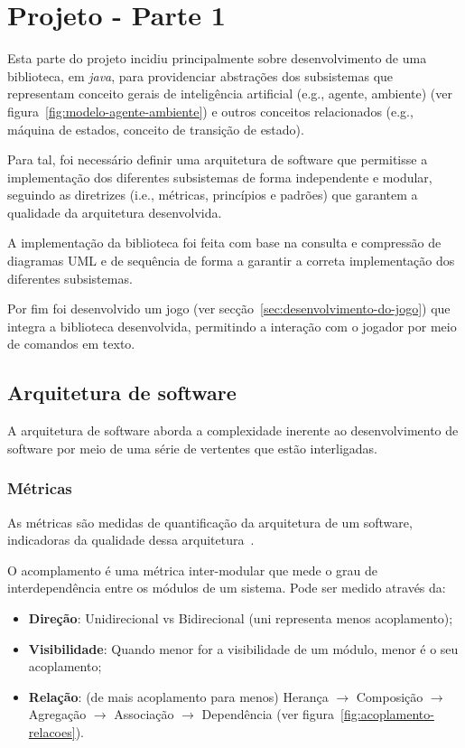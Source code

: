 \chapter{Projeto - Parte 1} \label{ch:projeto-parte1}

Esta parte do projeto incidiu principalmente sobre desenvolvimento de uma biblioteca, em \textit{java}, para providenciar abstrações dos subsistemas que representam conceito gerais de inteligência artificial (e.g., agente, ambiente) (ver figura~\ref{fig:modelo-agente-ambiente}) e outros conceitos relacionados (e.g., máquina de estados, conceito de transição de estado).

Para tal, foi necessário definir uma arquitetura de software que permitisse a implementação dos diferentes subsistemas de forma independente e modular, seguindo as diretrizes (i.e., métricas, princípios e padrões) que garantem a qualidade da arquitetura desenvolvida.

A implementação da biblioteca foi feita com base na consulta e compressão de diagramas UML e de sequência de forma a garantir a correta implementação dos diferentes subsistemas.

Por fim foi desenvolvido um jogo (ver secção~\ref{sec:desenvolvimento-do-jogo}) que integra a biblioteca desenvolvida, permitindo a interação com o jogador por meio de comandos em texto.


\section{Arquitetura de software}\label{sec:arquitetura-de-software}

A arquitetura de software aborda a complexidade inerente ao desenvolvimento de software por meio de uma série de vertentes que estão interligadas.

\subsection{Métricas}\label{subsec:metricas}

As métricas são medidas de quantificação da arquitetura de um software, indicadoras da qualidade dessa arquitetura~\cite{isel:iasa:slides:intro-eng-soft-parte-2}.

O acomplamento é uma métrica inter-modular que mede o grau de interdependência entre os módulos de um sistema. Pode ser medido através da:
\begin{itemize}
    \item \textbf{Direção}: Unidirecional vs Bidirecional (uni representa menos acoplamento);
    \item \textbf{Visibilidade}: Quando menor for a visibilidade de um módulo, menor é o seu acoplamento;
    \item \textbf{Relação}: (de mais acoplamento para menos) Herança $\rightarrow$ Composição $\rightarrow$ Agregação $\rightarrow$ Associação $\rightarrow$ Dependência (ver figura~\ref{fig:acoplamento-relacoes}).
\end{itemize}


